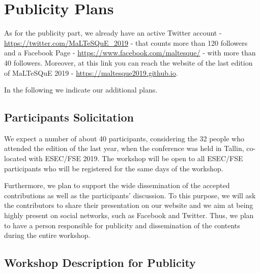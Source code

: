 
\section{Publicity Plans}

As for the publicity part, we already have an active Twitter account - \url{https://twitter.com/MaLTeSQuE_2019} - that counts more than 120 followers and a Facebook Page - \url{https://www.facebook.com/maltesque/} - with more than 40 followers.
Moreover, at this link you can reach the website of the last edition of MaLTeSQuE 2019 - \url{https://maltesque2019.github.io}.

In the following we indicate our additional plans.

\subsection{Participants Solicitation}

We expect a number of about 40 participants, considering the 32 people who attended the edition of the last year, when the conference was held in Tallin, co-located with ESEC/FSE 2019.
The workshop will be open to all ESEC/FSE participants who will be registered for the same days of the workshop.

Furthermore, we plan to support the wide dissemination of the accepted contributions as well as the participants' discussion.
To this purpose, we will ask the contributors to share their presentation on our website and we aim at being highly present on social networks, such as Facebook and Twitter.
Thus, we plan to have a person responsible for publicity and dissemination of the contents during the entire workshop.

\subsection{Workshop Description for Publicity}

